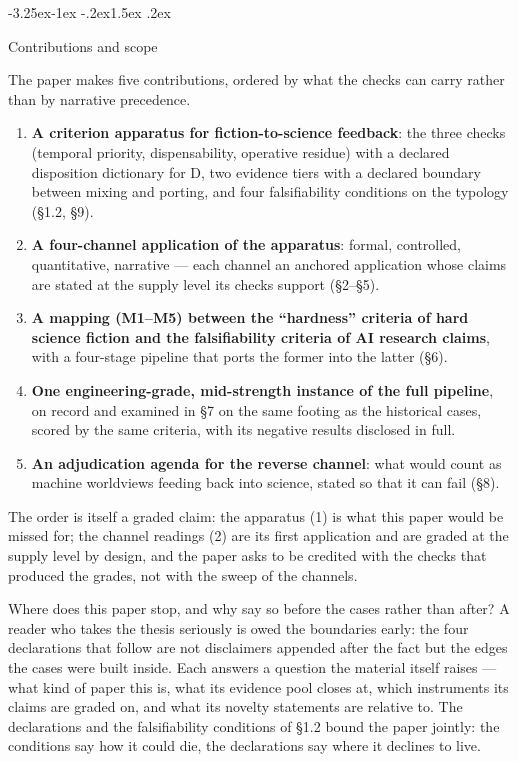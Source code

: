 \documentclass[11pt,a4paper]{article}
\makeatletter
\renewcommand\subsection{\@startsection{subsection}{2}{\z@}%
  {-3.25ex\@plus -1ex \@minus -.2ex}{1.5ex \@plus .2ex}%
  {\normalfont\large\bfseries\raggedright}}
\makeatother
\begin{document}
\subsection{Contributions and scope}

The paper makes five contributions, ordered by what the checks can carry rather than by narrative precedence.

\begin{enumerate}[leftmargin=1.6em,itemsep=2pt,parsep=0pt,topsep=3pt]
\item \textbf{A criterion apparatus for fiction-to-science feedback}: the three checks (temporal priority, dispensability, operative residue) with a declared disposition dictionary for D, two evidence tiers with a declared boundary between mixing and porting, and four falsifiability conditions on the typology (§1.2, §9).
\item \textbf{A four-channel application of the apparatus}: formal, controlled, quantitative, narrative — each channel an anchored application whose claims are stated at the supply level its checks support (§2–§5).
\item \textbf{A mapping (M1–M5) between the ``hardness'' criteria of hard science fiction and the falsifiability criteria of AI research claims}, with a four-stage pipeline that ports the former into the latter (§6).
\item \textbf{One engineering-grade, mid-strength instance of the full pipeline}, on record and examined in §7 on the same footing as the historical cases, scored by the same criteria, with its negative results disclosed in full.
\item \textbf{An adjudication agenda for the reverse channel}: what would count as machine worldviews feeding back into science, stated so that it can fail (§8).
\end{enumerate}

The order is itself a graded claim: the apparatus (1) is what this paper would be missed for; the channel readings (2) are its first application and are graded at the supply level by design, and the paper asks to be credited with the checks that produced the grades, not with the sweep of the channels.

Where does this paper stop, and why say so before the cases rather than after? A reader who takes the thesis seriously is owed the boundaries early: the four declarations that follow are not disclaimers appended after the fact but the edges the cases were built inside. Each answers a question the material itself raises --- what kind of paper this is, what its evidence pool closes at, which instruments its claims are graded on, and what its novelty statements are relative to. The declarations and the falsifiability conditions of \S1.2 bound the paper jointly: the conditions say how it could die, the declarations say where it declines to live.
\end{document}
